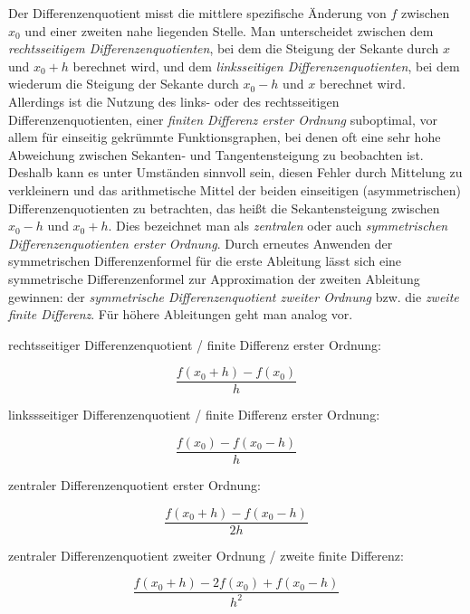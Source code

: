 \documentclass{scrartcl}
\begin{document}
Der Differenzenquotient misst die mittlere spezifische Änderung von $f$ zwischen $x_0$ und einer zweiten nahe liegenden Stelle. Man unterscheidet zwischen dem \textit{rechtsseitigem Differenzenquotienten}, bei dem die Steigung der Sekante durch $x$ und $x_0 + h$ berechnet wird, und dem \textit{linksseitigen Differenzenquotienten}, bei dem wiederum die Steigung der Sekante durch $x_0 - h$ und $x$ berechnet wird. Allerdings ist die Nutzung des links- oder des rechtsseitigen Differenzenquotienten, einer \textit{finiten Differenz erster Ordnung} suboptimal, vor allem für einseitig gekrümmte Funktionsgraphen, bei denen oft eine sehr hohe Abweichung zwischen Sekanten- und Tangentensteigung zu beobachten ist. Deshalb kann es unter Umständen sinnvoll sein, diesen Fehler durch Mittelung zu verkleinern und das arithmetische Mittel der beiden einseitigen (asymmetrischen) Differenzenquotienten zu betrachten, das heißt die Sekantensteigung zwischen $x_0 - h$ und $x_0 + h$. Dies bezeichnet man als \textit{zentralen} oder auch \textit{symmetrischen Differenzenquotienten erster Ordnung}. Durch erneutes Anwenden der symmetrischen Differenzenformel für die erste Ableitung lässt sich eine symmetrische Differenzenformel zur Approximation der zweiten Ableitung gewinnen: der \textit{symmetrische Differenzenquotient zweiter Ordnung} bzw. die \textit{zweite finite Differenz}. Für höhere Ableitungen geht man analog vor.\cite{westermann}
\begin{shaded}
\begin{center}
 rechtsseitiger Differenzenquotient / finite Differenz erster Ordnung:
 \end{center} \[ \frac {f(x_0 + h) - f(x_0)}{h} \]
\begin{center}
 linkssseitiger Differenzenquotient / finite Differenz erster Ordnung:
 \end{center} \[ \frac {f(x_0) - f(x_0 - h)}{h} \]
\begin{center}
 zentraler Differenzenquotient erster Ordnung:
 \end{center} \[ \frac {f(x_0 + h) - f(x_0-h)}{2h} \]
\begin{center}
 zentraler Differenzenquotient zweiter Ordnung / zweite finite Differenz:
 \end{center} \[ \frac{f(x_0+h) - 2f(x_0)+f(x_0-h)}{h^2} \]
\end{shaded}
\end{document}
